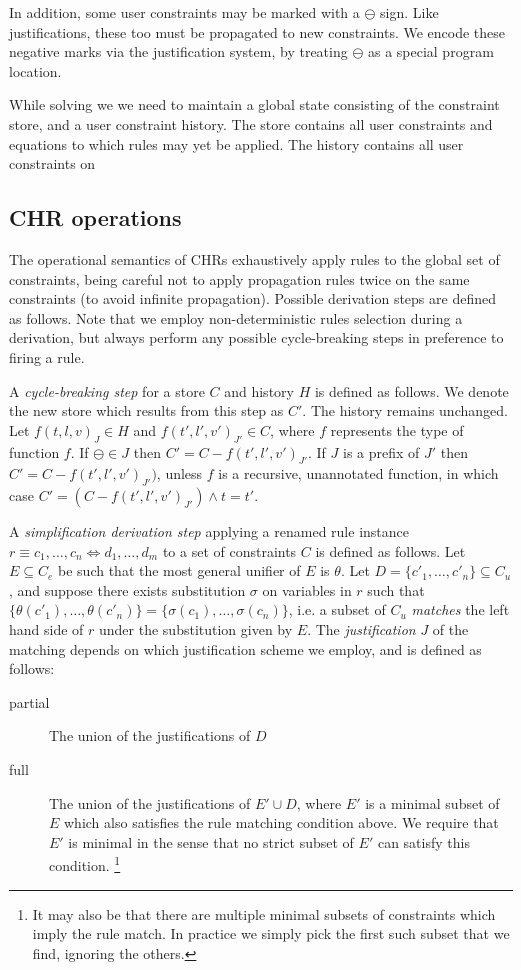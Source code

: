 \documentclass{article}
\newcommand{\simparrow}[0]{\Longleftrightarrow}
\begin{document}
In addition, some user constraints may be marked with a $\ominus$ sign. 
Like justifications, these too must be propagated to new constraints.
We encode these negative marks via the justification system, 
by treating $\ominus$ as a special program location.

While solving we we need to maintain a global state consisting of the
constraint store, and a user constraint history.
The store contains all user constraints and equations to which rules may yet
be applied.
The history contains all user constraints on 

\subsection{CHR operations}

The operational semantics of CHRs exhaustively apply rules to the
global set of constraints, being careful not to apply propagation rules twice 
on the same constraints (to avoid infinite propagation).  
Possible derivation steps are defined as follows.
Note that we employ non-deterministic rules selection during a derivation,
but always perform any possible cycle-breaking steps in preference to firing a
rule.


A \emph{cycle-breaking step} for a store $C$ and history $H$ is defined as 
follows. We denote the new store which results from this step as $C'$. The
history remains unchanged.
Let $f(t,l,v)_{J} \in H$ and $f(t',l',v')_{J'}\in C$, where $f$ represents the 
type of function $f$. 
If $\ominus \in J$ then $C' = C - f(t',l',v')_{J'}$.
If $J$ is a prefix of $J'$ then $C' = C - f(t',l',v')_{J'})$,
unless $f$ is a recursive, unannotated function, in which case
$C' = (C - f(t',l',v')_{J'}) \wedge t = t'$.


A \emph{simplification derivation step} 
applying a renamed rule instance 
$r \equiv c_1, \ldots, c_n \simparrow d_1, \ldots, d_m$ 
to a set of constraints $C$ is defined as follows.
Let $E \subseteq C_e$ be such that the most general unifier of
$E$ is $\theta$. 
Let $D = \{c'_1, \ldots, c'_n\} \subseteq C_u$,
and suppose there exists substitution $\sigma$ on variables in $r$
such that $\{\theta(c'_1), \ldots, \theta(c'_n)\} = 
\{\sigma(c_1), \ldots, \sigma(c_n)\}$, 
i.e. 
a subset of $C_u$ \emph{matches} the left hand side of $r$ under the
substitution given by $E$. 
The \emph{justification} $J$ of the matching depends on which justification
scheme we employ, and is defined as follows:
\begin{description}
\item [partial] The union of the justifications of $D$
\item [full] The union of the justifications of $E' \cup D$, where $E'$ is a
	     minimal subset of $E$ which also satisfies the rule matching
	     condition above. We require that $E'$ is minimal in the sense
	     that no strict subset of $E'$ can satisfy this condition.
\footnote{It may also be that there are multiple minimal subsets of constraints 
          which imply the rule match. In practice we simply pick the first such
          subset that we find, ignoring the others.}

\end{description}
\end{document}

